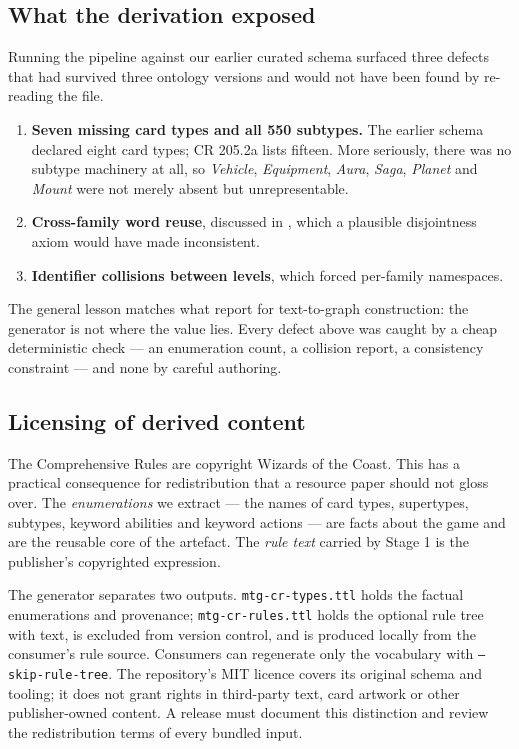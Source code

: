 \documentclass[11pt,a4paper]{article}
\begin{document}
\subsection{What the derivation exposed}

Running the pipeline against our earlier curated schema surfaced three defects that had survived three ontology versions and would not have been found by re-reading the file.

\begin{enumerate}[leftmargin=1.4em, itemsep=2pt]
  \item \textbf{Seven missing card types and all 550 subtypes.} The earlier schema declared eight card types; CR 205.2a lists fifteen. More seriously, there was no subtype machinery at all, so \emph{Vehicle}, \emph{Equipment}, \emph{Aura}, \emph{Saga}, \emph{Planet} and \emph{Mount} were not merely absent but unrepresentable.
  \item \textbf{Cross-family word reuse}, discussed in , which a plausible disjointness axiom would have made inconsistent.
  \item \textbf{Identifier collisions between levels}, which forced per-family namespaces.
\end{enumerate}

The general lesson matches what \citet{tiwari2026ontoprompt} report for text-to-graph construction: the generator is not where the value lies. Every defect above was caught by a cheap deterministic check --- an enumeration count, a collision report, a consistency constraint --- and none by careful authoring.

\subsection{Licensing of derived content}
\label{sec:licensing}

The Comprehensive Rules are copyright Wizards of the Coast. This has a practical consequence for redistribution that a resource paper should not gloss over. The \emph{enumerations} we extract --- the names of card types, supertypes, subtypes, keyword abilities and keyword actions --- are facts about the game and are the reusable core of the artefact. The \emph{rule text} carried by Stage 1 is the publisher's copyrighted expression.

The generator separates two outputs. \texttt{mtg-cr-types.ttl} holds the factual enumerations and provenance; \texttt{mtg-cr-rules.ttl} holds the optional rule tree with text, is excluded from version control, and is produced locally from the consumer's rule source. Consumers can regenerate only the vocabulary with \texttt{--skip-rule-tree}. The repository's MIT licence covers its original schema and tooling; it does not grant rights in third-party text, card artwork or other publisher-owned content. A release must document this distinction and review the redistribution terms of every bundled input.
\end{document}
